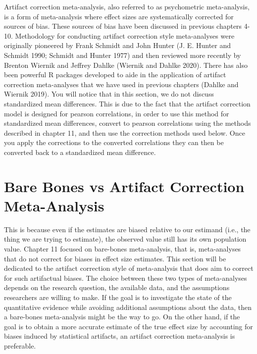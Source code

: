 \documentclass[
  letterpaper,
  DIV=11,
  numbers=noendperiod]{scrreprt}
\begin{document}
Artifact correction meta-analysis, also referred to as psychometric
meta-analysis, is a form of meta-analysis where effect sizes are
systematically corrected for sources of bias. These sources of bias have
been discussed in previous chapters 4-10. Methodology for conducting
artifact correction style meta-analyses were originally pioneered by
Frank Schmidt and John Hunter (J. E. Hunter and Schmidt 1990; Schmidt
and Hunter 1977) and then reviewed more recently by Brenton Wiernik and
Jeffrey Dahlke (Wiernik and Dahlke 2020). There has also been powerful R
packages developed to aide in the application of artifact correction
meta-analyses that we have used in previous chapters (Dahlke and Wiernik
2019). You will notice that in this section, we do not discuss
standardized mean differences. This is due to the fact that the artifact
correction model is designed for pearson correlations, in order to use
this method for standardized mean differences, convert to pearson
correlations using the methods described in chapter 11, and then use the
correction methods used below. Once you apply the corrections to the
converted correlations they can then be converted back to a standardized
mean difference.

\hypertarget{bare-bones-vs-artifact-correction-meta-analysis}{%
\section{Bare Bones vs Artifact Correction
Meta-Analysis}\label{bare-bones-vs-artifact-correction-meta-analysis}}

This is because even if the estimates are biased relative to our
estimand (i.e., the thing we are trying to estimate), the observed value
still has its own population value. Chapter 11 focused on bare-bones
meta-analysis, that is, meta-analyses that do not correct for biases in
effect size estimates. This section will be dedicated to the artifact
correction style of meta-analysis that does aim to correct for such
artifactual biases. The choice between these two types of meta-analyses
depends on the research question, the available data, and the
assumptions researchers are willing to make. If the goal is to
investigate the state of the quantitative evidence while avoiding
additional assumptions about the data, then a bare-bones meta-analysis
might be the way to go. On the other hand, if the goal is to obtain a
more accurate estimate of the true effect size by accounting for biases
induced by statistical artifacts, an artifact correction meta-analysis
is preferable.
\end{document}
